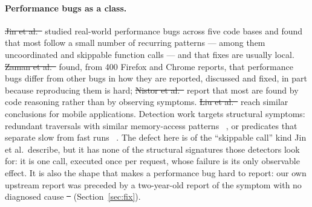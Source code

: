 \documentclass[pdflatex,sn-basic,twocolumn]{sn-jnl}%
\providecommand{\DIFdel}[1]{{\protect\color{red}\sout{#1}}}                      %
\providecommand{\DIFaddbegin}{} %
\providecommand{\DIFaddend}{} %
\providecommand{\DIFdelbegin}{} %
\providecommand{\DIFdelend}{} %
\newcommand{\DIFscaledelfig}{0.5}
\newlength{\DIFdelgraphicswidth} %
\newlength{\DIFdelgraphicsheight} %
\newcommand{\DIFaddincludegraphics}[2][]{{\color{blue}\fbox{\DIFOincludegraphics[#1]{#2}}}} %
\newcommand{\DIFdelincludegraphics}[2][]{%
\sbox{\DIFdelgraphicsbox}{\DIFOincludegraphics[#1]{#2}}%
\settoboxwidth{\DIFdelgraphicswidth}{\DIFdelgraphicsbox} %
\settoboxtotalheight{\DIFdelgraphicsheight}{\DIFdelgraphicsbox} %
\scalebox{\DIFscaledelfig}{%
\parbox[b]{\DIFdelgraphicswidth}{\usebox{\DIFdelgraphicsbox}\\[-\baselineskip] \rule{\DIFdelgraphicswidth}{0em}}\llap{\resizebox{\DIFdelgraphicswidth}{\DIFdelgraphicsheight}{%
\setlength{\unitlength}{\DIFdelgraphicswidth}%
\begin{picture}(1,1)%
\thicklines\linethickness{2pt} %
{\color[rgb]{1,0,0}\put(0,0){\framebox(1,1){}}}%
{\color[rgb]{1,0,0}\put(0,0){\line( 1,1){1}}}%
{\color[rgb]{1,0,0}\put(0,1){\line(1,-1){1}}}%
\end{picture}%
}\hspace*{3pt}}} %
} %
\DeclareRobustCommand{\DIFaddbegin}{\DIFOaddbegin \let\includegraphics\DIFaddincludegraphics} %
\DeclareRobustCommand{\DIFaddend}{\DIFOaddend \let\includegraphics\DIFOincludegraphics} %
\DeclareRobustCommand{\DIFdelbegin}{\DIFOdelbegin \let\includegraphics\DIFdelincludegraphics} %
\DeclareRobustCommand{\DIFdelend}{\DIFOaddend \let\includegraphics\DIFOincludegraphics} %
\begin{document}
\paragraph{Performance bugs as a class.} \DIFdelbegin \DIFdel{Jin et
al.~}%
\DIFdelend \DIFaddbegin \citet{jin2012understanding} \DIFaddend studied real-world performance bugs across five
code bases and found that most follow a small number of recurring patterns ---
among them uncoordinated and skippable function calls --- and that fixes are
usually local. \DIFdelbegin \DIFdel{Zaman et al.~}%
\DIFdelend \DIFaddbegin \citet{zaman2012qualitative} \DIFaddend found, from 400
Firefox and Chrome reports, that performance bugs differ from other bugs in
how they are reported, discussed and fixed, in part because reproducing them
is hard; \DIFdelbegin \DIFdel{Nistor et al.~}%
\DIFdelend \DIFaddbegin \citet{nistor2013discovering} \DIFaddend report that most are found
by code reasoning rather than by observing symptoms. \DIFdelbegin \DIFdel{Liu et
al.~}%
\DIFdelend \DIFaddbegin \citet{liu2014characterizing} \DIFaddend reach similar conclusions for mobile
applications. Detection work targets structural symptoms: redundant traversals
with similar memory-access patterns~\DIFdelbegin %
\DIFdelend \DIFaddbegin \citep{nistor2013toddler}\DIFaddend , or predicates
that separate slow from fast runs~\DIFdelbegin %
\DIFdelend \DIFaddbegin \citep{song2014statistical}\DIFaddend . The defect here
is of the ``skippable call'' kind Jin et al.\ describe, but it has none of the
structural signatures those detectors look for: it is one call, executed once
per request, whose failure is its only observable effect. It is also the shape
that makes a performance bug hard to report: our own upstream report was
preceded by a two-year-old report of the symptom with no diagnosed cause
\DIFdelbegin \DIFdel{~}%
\DIFdelend (Section~\ref{sec:fix}).
\end{document}
